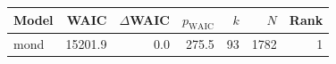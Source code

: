 \begin{tabular}{lrrrrrr}
\toprule
Model & WAIC & $\Delta$WAIC & $p_{\mathrm{WAIC}}$ & $k$ & $N$ & Rank \\
\midrule
mond & 15201.9 & 0.0 & 275.5 & 93 & 1782 & 1 \\
\bottomrule
\end{tabular}
